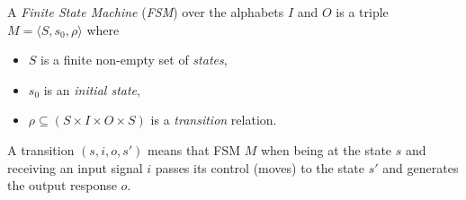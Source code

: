 \documentclass[conference]{IEEEtran}
\begin{document}
A \emph{Finite State Machine} (\emph{FSM}) over the alphabets $I$ and $O$ is a triple $M = \langle S, s_0, \rho \rangle$ where 
\begin{itemize}
\item
$S$ is a finite non-empty set of \emph{states},
\item
$s_0$ is an \emph{initial state},
\item
$\rho \subseteq (S \times I \times O \times S)$ is a \emph{transition} relation. 
\end{itemize}
A transition $(s, i, o, s')$ means that FSM $M$ when being at the state $s$ and receiving an input signal $i$ passes its control (moves) to the state $s'$ and generates the output response $o$.

\end{document}
